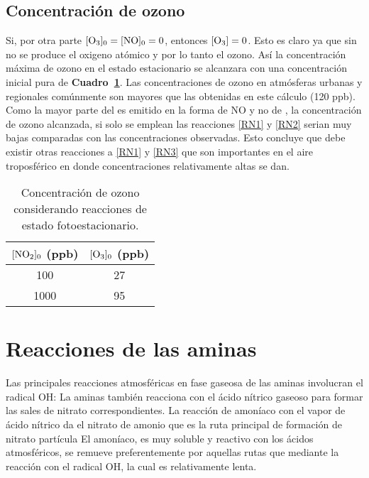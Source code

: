 \subsection{Concentración de ozono}\label{cozono}
Si, por otra parte $[\ce{O3}]_0=[\ce{NO}]_0=0$, entonces $[\ce{O3}]=0$. Esto es claro ya que sin  no se produce el oxigeno atómico y por lo tanto el ozono.  Así la concentración máxima de ozono en el estado estacionario se alcanzara con una concentración inicial pura de  \textbf{Cuadro~\ref{ozono_foto}}. Las concentraciones de ozono en atmósferas urbanas y regionales comúnmente son mayores que las obtenidas en este cálculo (120 ppb). Como la mayor parte del   es emitido en la forma de NO y no de  , la concentración de ozono alcanzada, si solo se emplean las reacciones \ref{RN1} y \ref{RN2} serian muy bajas comparadas con  las concentraciones observadas. Esto concluye que debe existir otras reacciones a \ref{RN1} y \ref{RN3} que son importantes en el aire troposférico en donde concentraciones relativamente altas se dan.
\begin{table}[htp]
\caption[Concentración de ozono sin COV]{Concentración de ozono considerando reacciones de estado fotoestacionario.}
\begin{center}
\begin{tabular}{|c|c|}\hline
$[\ce{NO2}]_0$ (ppb) &$[\ce{O3}]_0$ (ppb) \\\hline
100   & 27\\
1000 & 95 \\ \hline
\end{tabular}
\end{center}
\label{ozono_foto}
\end{table}%

\section{Reacciones de las aminas}\label{raminas}
Las principales reacciones atmosféricas en fase gaseosa de las aminas involucran el radical OH:
La aminas también reacciona con el ácido nítrico gaseoso para formar las sales de nitrato correspondientes.
La reacción de amoníaco con el vapor de ácido nítrico da el nitrato de amonio que es la ruta principal de formación de nitrato partícula
El amoníaco, es muy soluble y reactivo con los ácidos atmosféricos, se remueve preferentemente por aquellas rutas que mediante la reacción con el radical OH, la cual es relativamente lenta.

